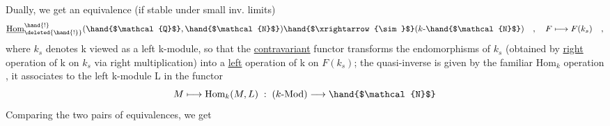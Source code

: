 Dually, we get an equivalence (if  stable under small inv. limits)
\[\underline{\text{Hom}}^{\hand{!}}_{\deleted{\hand{!}}}(\hand{$\mathcal{Q}$},\hand{$\mathcal{N}$}) \hand{$\xrightarrow{\sim}$} (k\text{-}\hand{$\mathcal{N}$}) \quad , \quad F \longmapsto F(k_{s}) \quad ,\]
where $k_{s}$ denotes k viewed as a left k-module, so that the \uline{contravariant}
functor  transforms the endomorphisms of $k_{s}$ (obtained by \uline{right} operation
of k on $k_{s}$ via right multiplication) into a \uline{left} operation of k on $F(k_{s})$;
the quasi-inverse is given by the familiar $\text{Hom}_{k}$ operation , it 
associates to the left k-module L in  the functor
\[M \longmapsto \text{Hom}_{k}(M,L) \;:\; (k\text{-Mod}) \longrightarrow \hand{$\mathcal{N}$}\]
 Comparing the two pairs of equivalences, we get 
